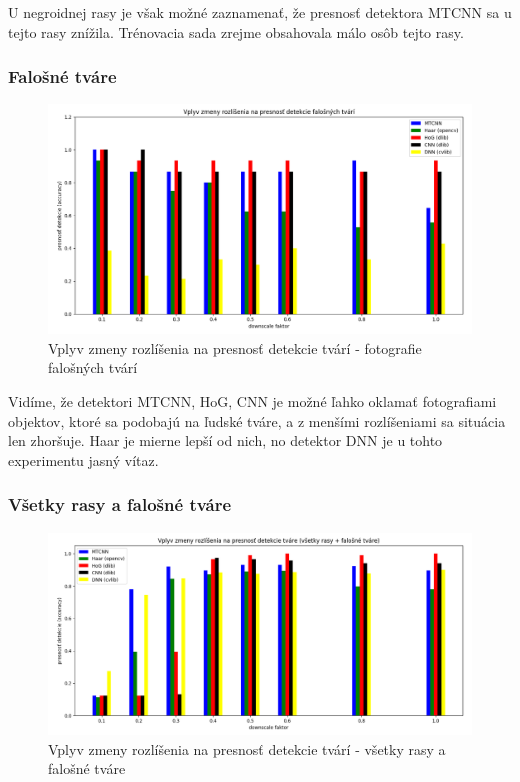 \documentclass[]{article}
\begin{document}
	U negroidnej rasy je však možné zaznamenať, že presnosť detektora MTCNN sa u tejto rasy znížila. Trénovacia sada zrejme obsahovala málo osôb tejto rasy.
	
	\newpage
	\subsubsection*{Falošné tváre}
	\begin{figure}[h!]
		\includegraphics[width=\textwidth]{Vysledky_rozslisenie/fake/Figure_1.png}
		\caption{Vplyv zmeny rozlíšenia na presnosť detekcie tvárí - fotografie falošných tvárí}
	\end{figure}

	Vidíme, že detektori MTCNN, HoG, CNN je možné ľahko oklamať fotografiami objektov, ktoré sa podobajú na ľudské tváre, a z menšími rozlíšeniami sa situácia len zhoršuje. Haar je mierne lepší od nich, no detektor DNN je u tohto experimentu jasný vítaz.
	
	\subsubsection*{Všetky rasy a falošné tváre}
	\begin{figure}[h!]
		\includegraphics[width=\textwidth]{Vysledky_rozslisenie/all/Figure_1.png}
		\caption{Vplyv zmeny rozlíšenia na presnosť detekcie tvárí - všetky rasy a falošné tváre}
	\end{figure}
\end{document}
